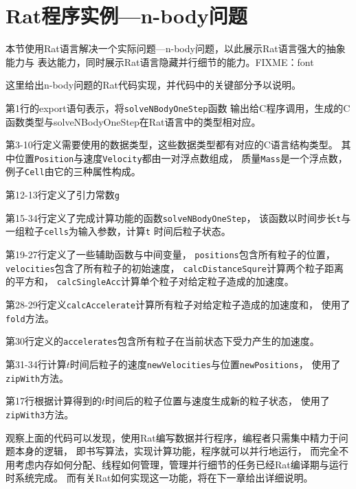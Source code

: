 \section{Rat程序实例---n-body问题}\label{sec:n-body}
本节使用Rat语言解决一个实际问题---n-body问题，以此展示Rat语言强大的抽象能力与
表达能力，同时展示Rat语言隐藏并行细节的能力。FIXME：font
\begin{quotation}
\end{quotation}

这里给出n-body问题的Rat代码实现，并代码中的关键部分予以说明。
\begin{compactitem}
  \item 第1行的export语句表示，将\texttt{solveNBodyOneStep}函数
    输出给C程序调用，生成的C函数类型与solveNBodyOneStep在Rat语言中的类型相对应。
  \item 第3-10行定义需要使用的数据类型，这些数据类型都有对应的C语言结构类型。
    其中位置\texttt{Position}与速度\texttt{Velocity}都由一对浮点数组成，
    质量\texttt{Mass}是一个浮点数，例子\texttt{Cell}由它的三种属性构成。
  \item 第12-13行定义了引力常数\texttt{g}
  \item 第15-34行定义了完成计算功能的函数\texttt{solveNBodyOneStep}，
    该函数以时间步长\texttt{t}与一组粒子\texttt{cells}为输入参数，计算\texttt{t}
    时间后粒子状态。
    \begin{compactitem}
      \item 第19-27行定义了一些辅助函数与中间变量，
        \texttt{positions}包含所有粒子的位置，\texttt{velocities}包含了所有粒子的初始速度，
        \texttt{calcDistanceSqure}计算两个粒子距离的平方和，
        \texttt{calcSingleAcc}计算单个粒子对给定粒子造成的加速度。
      \item 第28-29行定义\texttt{calcAccelerate}计算所有粒子对给定粒子造成的加速度和，
        使用了\texttt{fold}方法。
      \item 第30行定义的\texttt{accelerates}包含所有粒子在当前状态下受力产生的加速度。
      \item 第31-34行计算$t$时间后粒子的速度\texttt{newVelocities}与位置\texttt{newPositions}，
        使用了\texttt{zipWith}方法。
      \item 第17行根据计算得到的$t$时间后的粒子位置与速度生成新的粒子状态，
        使用了\texttt{zipWith3}方法。
    \end{compactitem}
\end{compactitem}



观察上面的代码可以发现，使用Rat编写数据并行程序，编程者只需集中精力于问题本身的逻辑，
即书写算法，实现计算功能，程序就可以并行地运行，
而完全不用考虑内存如何分配、线程如何管理，管理并行细节的任务已经Rat编译期与运行时系统完成。
而有关Rat如何实现这一功能，将在下一章给出详细说明。
